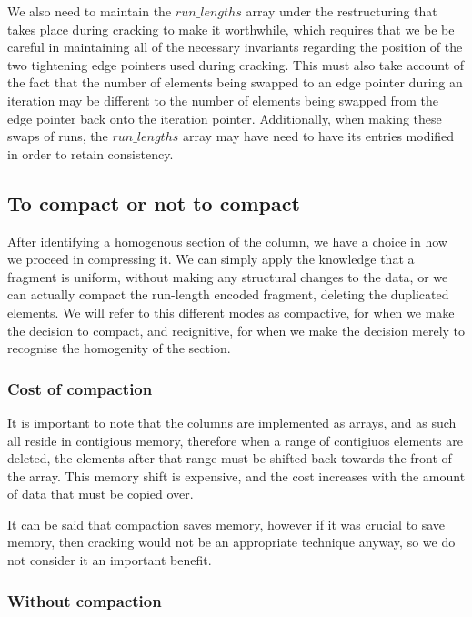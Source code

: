 We also need to maintain the $run\_lengths$ array under the restructuring that takes place during
cracking to make it worthwhile, which requires that we be be careful in maintaining all of the
necessary invariants regarding the position of the two tightening edge pointers used during cracking.
This must also take account of the fact that the number of elements being swapped to an edge
pointer during an iteration may be different to the number of elements being swapped from the edge
pointer back onto the iteration pointer. Additionally, when making these swaps of runs, the
$run\_lengths$ array may have need to have its entries modified in order to retain consistency.

\subsection{To compact or not to compact}

After identifying a homogenous section of the column, we have a choice in how we proceed in
compressing it. We can simply apply the knowledge that a fragment is uniform, without making any
structural changes to the data, or we can actually compact the run-length encoded fragment, deleting
the duplicated elements. We will refer to this different modes as compactive, for when we make the
decision to compact, and recignitive, for when we make the decision merely to recognise the
homogenity of the section.

\subsubsection{Cost of compaction}

It is important to note that the columns are implemented as arrays, and as such all reside in
contigious memory, therefore when a range of contigiuos elements are deleted, the elements after
that range must be shifted back towards the front of the array. This memory shift is expensive,
and the cost increases with the amount of data that must be copied over.

It can be said that compaction saves memory, however if it was crucial to save memory, then cracking
would not be an appropriate technique anyway, so we do not consider it an important benefit.

\subsubsection{Without compaction}

